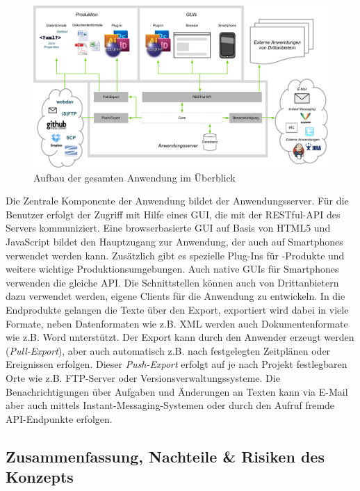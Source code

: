 \begin{figure}[htb]
\begin{center}
\includegraphics[width=\textwidth]{media/GesamtesSystem.pdf}
\caption{Aufbau der gesamten Anwendung im Überblick}
\label{chart:gesamtessystem}
\end{center}
\end{figure}

Die Zentrale Komponente der Anwendung bildet der Anwendungsserver. Für die Benutzer erfolgt der Zugriff mit Hilfe eines GUI, die mit der RESTful-API des Servers kommuniziert. Eine browserbasierte GUI auf Basis von HTML5 und JavaScript bildet den Hauptzugang zur Anwendung, der auch auf Smartphones verwendet werden kann. Zusätzlich gibt es spezielle Plug-Ins für -Produkte und weitere wichtige Produktionsumgebungen. Auch native GUIs für Smartphones verwenden die gleiche API. Die Schnittstellen können auch von Drittanbietern dazu verwendet werden, eigene Clients für die Anwendung zu entwickeln. In die Endprodukte gelangen die Texte über den Export, exportiert wird dabei in viele Formate, neben Datenformaten wie z.B. XML werden auch Dokumentenformate wie z.B. Word unterstützt. Der Export kann durch den Anwender erzeugt werden (\emph{Pull-Export}), aber auch automatisch z.B. nach festgelegten Zeitplänen oder Ereignissen erfolgen. Dieser \emph{Push-Export} erfolgt auf je nach Projekt festlegbaren Orte wie z.B. FTP-Server oder Versionsverwaltungssysteme. Die Benachrichtigungen über Aufgaben und Änderungen an Texten kann via E-Mail aber auch mittels Instant-Messaging-Systemen oder durch den Aufruf fremde API-Endpunkte erfolgen.

\pagebreak

\subsection{Zusammenfassung, Nachteile \& Risiken des Konzepts}

